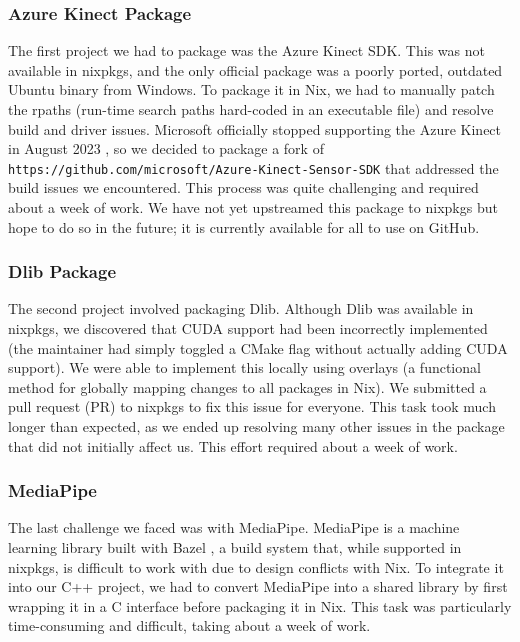\subsubsection{Azure Kinect Package}

The first project we had to package was the Azure Kinect SDK. This was not available in nixpkgs, and the only official package was a poorly ported, outdated Ubuntu binary from Windows. To package it in Nix, we had to manually patch the rpaths (run-time search paths hard-coded in an executable file) and resolve build and driver issues. Microsoft officially stopped supporting the Azure Kinect in August 2023 \cite{noauthor_microsofts_nodate}, so we decided to package a fork of \texttt{https://github.com/microsoft/Azure-Kinect-Sensor-SDK} that addressed the build issues we encountered. This process was quite challenging and required about a week of work. We have not yet upstreamed this package to nixpkgs but hope to do so in the future; it is currently available for all to use on GitHub.

\subsubsection{Dlib Package}

The second project involved packaging Dlib. Although Dlib was available in nixpkgs, we discovered that CUDA support had been incorrectly implemented (the maintainer had simply toggled a CMake flag without actually adding CUDA support). We were able to implement this locally using overlays (a functional method for globally mapping changes to all packages in Nix). We submitted a pull request (PR) to nixpkgs to fix this issue for everyone. This task took much longer than expected, as we ended up resolving many other issues in the package that did not initially affect us. This effort required about a week of work.

\subsubsection{MediaPipe}

The last challenge we faced was with MediaPipe. MediaPipe is a machine learning library built with Bazel \cite{noauthor_bazelbuildbazel_2024}, a build system that, while supported in nixpkgs, is difficult to work with due to design conflicts with Nix. To integrate it into our C++ project, we had to convert MediaPipe into a shared library by first wrapping it in a C interface before packaging it in Nix. This task was particularly time-consuming and difficult, taking about a week of work.
